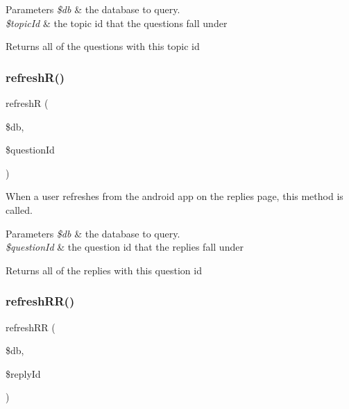 \begin{DoxyParams}{Parameters}
{\em \$db} & the database to query. \\
\hline
{\em \$topic\+Id} & the topic id that the questions fall under \\
\hline
\end{DoxyParams}
\begin{DoxyReturn}{Returns}
all of the questions with this topic id 
\end{DoxyReturn}
\mbox{\label{androidApi_8php_a9f07a32e2c6fd847ce3fca5979c93996}} 
\subsubsection{\texorpdfstring{refresh\+R()}{refreshR()}}
{\footnotesize\ttfamily refreshR (\begin{DoxyParamCaption}\item[{}]{\$db,  }\item[{}]{\$question\+Id }\end{DoxyParamCaption})}



When a user refreshes from the android app on the replies page, this method is called. 


\begin{DoxyParams}{Parameters}
{\em \$db} & the database to query. \\
\hline
{\em \$question\+Id} & the question id that the replies fall under \\
\hline
\end{DoxyParams}
\begin{DoxyReturn}{Returns}
all of the replies with this question id 
\end{DoxyReturn}
\mbox{\label{androidApi_8php_a74f05898b0ba4d0f3177cdd262df4893}} 
\subsubsection{\texorpdfstring{refresh\+R\+R()}{refreshRR()}}
{\footnotesize\ttfamily refresh\+RR (\begin{DoxyParamCaption}\item[{}]{\$db,  }\item[{}]{\$reply\+Id }\end{DoxyParamCaption})}



